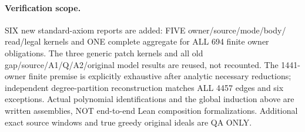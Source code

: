 \paragraph{Verification scope.}
SIX new standard-axiom reports are added: FIVE owner/source/mode/body/
read/legal kernels and ONE complete aggregate for ALL 694 finite
owner obligations. The three generic patch kernels and all old
gap/source/A1/Q/A2/original model results are reused, not recounted.
The 1441-owner finite premise is explicitly exhaustive after analytic
necessary reductions; independent degree-partition reconstruction
matches ALL 4457 edges and six exceptions. Actual polynomial
identifications and the global induction above are written assemblies,
NOT end-to-end Lean composition formalizations. Additional exact
source windows and true greedy original ideals are QA ONLY.
